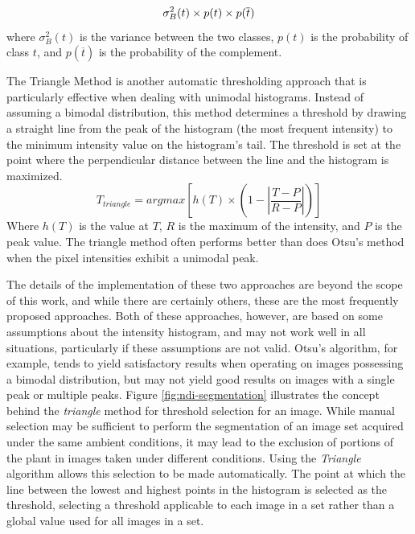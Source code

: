 \documentclass[letterpaper]{report}
\begin{document}
{%
\begin{equation}\label{eqn:otsu}
\sigma^2_B (t) \times p(t) \times p(\overline{t}) \\
\end{equation}
where $\sigma^2_B (t)$ is the variance between the two classes, $p(t)$ is the probability of class $t$, and $p(\overline{t})$ is the probability of the complement.

The Triangle Method is another automatic thresholding approach that is particularly effective when dealing with unimodal histograms. Instead of assuming a bimodal distribution, this method determines a threshold by drawing a straight line from the peak of the histogram (the most frequent intensity) to the minimum intensity value on the histogram’s tail. The threshold is set at the point where the perpendicular distance between the line and the histogram is maximized.
\begin{equation}\label{eqn:triangle}
T_{triangle} = argmax \left[ h(T) \times \left( 1 - \left| \frac{T - P}{R - P} \right| \right) \right]
\end{equation}
Where $h(T)$ is the value at $T$, $R$ is the maximum of the intensity, and $P$ is the peak value. The triangle method often performs better than does Otsu's method when the pixel intensities exhibit a unimodal peak.

The details of the implementation of these two approaches are beyond the scope of this work, and while there are certainly others, these are the most frequently proposed approaches. Both of these approaches, however, are based on some assumptions about the intensity histogram, and may not work well in all situations, particularly if these assumptions are not valid. Otsu's algorithm, for example, tends to yield satisfactory results when operating on images possessing a bimodal distribution, but may not yield good results on images with a single peak or multiple peaks. Figure \ref{fig:ndi-segmentation} illustrates the concept behind the \textit{triangle} method for threshold selection for an image. While manual selection may be sufficient to perform the segmentation of an image set acquired under the same ambient conditions, it may lead to the exclusion of portions of the plant in images taken under different conditions. Using the \textit{Triangle} algorithm \parencite{Brink1996-xy,Zack1977-yl} allows this selection to be made automatically. The point at which the line between the lowest and highest points in the histogram is selected as the threshold, selecting a threshold applicable to each image in a set rather than a global value used for all images in a set.

}
\end{document}
